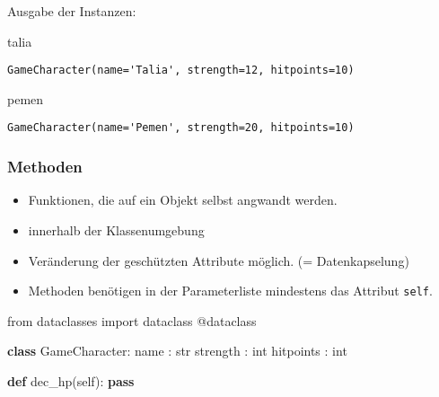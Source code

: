 \documentclass[
  11pt,
  a4paper,
  DIV=11,
  numbers=noendperiod]{scrartcl}
\newenvironment{Shaded}{\begin{snugshade}}{\end{snugshade}}
\newcommand{\AttributeTok}[1]{\textcolor[rgb]{0.40,0.45,0.13}{#1}}
\newcommand{\BuiltInTok}[1]{\textcolor[rgb]{0.00,0.23,0.31}{#1}}
\newcommand{\ControlFlowTok}[1]{\textcolor[rgb]{0.00,0.23,0.31}{\textbf{#1}}}
\newcommand{\ImportTok}[1]{\textcolor[rgb]{0.00,0.46,0.62}{#1}}
\newcommand{\KeywordTok}[1]{\textcolor[rgb]{0.00,0.23,0.31}{\textbf{#1}}}
\newcommand{\NormalTok}[1]{\textcolor[rgb]{0.00,0.23,0.31}{#1}}
\newcommand{\VariableTok}[1]{\textcolor[rgb]{0.07,0.07,0.07}{#1}}
\providecommand{\tightlist}{%
  \setlength{\itemsep}{0pt}\setlength{\parskip}{0pt}}\usepackage{longtable,booktabs,array}
\begin{document}
Ausgabe der Instanzen:

\begin{Shaded}
\begin{Highlighting}[numbers=left,,]
\NormalTok{talia}
\end{Highlighting}
\end{Shaded}

\begin{verbatim}
GameCharacter(name='Talia', strength=12, hitpoints=10)
\end{verbatim}

\begin{Shaded}
\begin{Highlighting}[numbers=left,,]
\NormalTok{pemen}
\end{Highlighting}
\end{Shaded}

\begin{verbatim}
GameCharacter(name='Pemen', strength=20, hitpoints=10)
\end{verbatim}

\subsubsection{Methoden}\label{methoden}

\begin{itemize}
\tightlist
\item
  Funktionen, die auf ein Objekt selbst angwandt werden.
\item
  innerhalb der Klassenumgebung
\item
  Veränderung der geschützten Attribute möglich. (= Datenkapselung)
\item
  Methoden benötigen in der Parameterliste mindestens das Attribut
  \texttt{self}.
\end{itemize}

\begin{Shaded}
\begin{Highlighting}[numbers=left,,]
\ImportTok{from}\NormalTok{ dataclasses }\ImportTok{import}\NormalTok{ dataclass}
\AttributeTok{@dataclass}

\KeywordTok{class}\NormalTok{ GameCharacter:}
\NormalTok{    name : }\BuiltInTok{str}
\NormalTok{    strength : }\BuiltInTok{int}
\NormalTok{    hitpoints : }\BuiltInTok{int}
    
    \KeywordTok{def}\NormalTok{ dec\_hp(}\VariableTok{self}\NormalTok{):}
        \ControlFlowTok{pass}
\end{Highlighting}
\end{Shaded}
\end{document}
